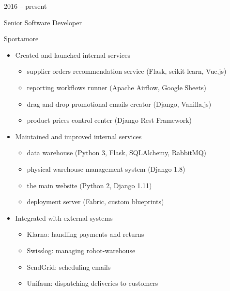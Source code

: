 \documentclass[a4paper,10pt]{article}
\newlength{\cvcolumngapwidth}
\newlength{\cvleftcolumnwidth}
\newlength{\cvrightcolumnwidth}
\newcommand{\cvtitlestyle}[1]{{\large\cvtitlefont\textcolor{cvtitlecolor}{#1}}}
\newcommand{\cvdurationstyle}[1]{{\small\cvdurationfont\textcolor{cvdurationcolor}{#1}}}
\newlength{\cvafteritemskipamount}
\newlength{\cvaftertitleskipamount}
\newlength{\cvparskip}
\newcommand{\cvitem}[2]{
    \begin{minipage}[t]{\cvleftcolumnwidth}
        \raggedleft #1
    \end{minipage}%
    \hspace{\cvcolumngapwidth}%
    \begin{minipage}[t]{\cvrightcolumnwidth}
        \setlength{\parskip}{\cvparskip} #2
    \end{minipage}

    \vspace{\cvafteritemskipamount}
}
\newcommand{\cvtitle}[1]{
    \cvtitlestyle{#1}

    \vspace{\cvaftertitleskipamount}
    \vspace{-\cvparskip}
}
\begin{document}
\cvitem{
    \cvdurationstyle{2016 -- present}
}{
    \cvtitle{Senior Software Developer}

    Sportamore

    \begin{itemize}[leftmargin=*]
        \item Created and launched internal services
	    \begin{itemize}[leftmargin=*]
		  \item supplier orders recommendation service (Flask, scikit-learn, Vue.js)
		  \item reporting workflows runner (Apache Airflow, Google Sheets)
		  \item drag-and-drop promotional emails creator (Django, Vanilla.js)
		  \item product prices control center (Django Rest Framework)
	    \end{itemize}
    \end{itemize}

    \begin{itemize}[leftmargin=*]
        \item Maintained and improved internal services 
	    \begin{itemize}[leftmargin=*]
		  \item data warehouse (Python 3, Flask, SQLAlchemy, RabbitMQ)
		  \item physical warehouse management system (Django 1.8)
		  \item the main website (Python 2, Django 1.11)
		  \item deployment server (Fabric, custom blueprints)
	    \end{itemize}
    \end{itemize}

    \begin{itemize}[leftmargin=*]
        \item Integrated with external systems
	    \begin{itemize}[leftmargin=*]
		  \item Klarna: handling payments and returns
		  \item Swisslog: managing robot-warehouse
		  \item SendGrid: scheduling emails
		  \item Unifaun: dispatching deliveries to customers
	    \end{itemize}
    \end{itemize}

}
\end{document}
